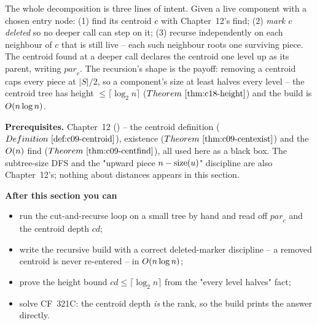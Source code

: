 \begin{topicintro}
The whole decomposition is three lines of intent. Given a live component with a
chosen entry node: (1) find its centroid \(c\) with Chapter~12's find; (2)
\emph{mark \(c\) deleted} so no deeper call can step on it; (3) recurse
independently on each neighbour of \(c\) that is still live -- each such neighbour
roots one surviving piece. The centroid found at a deeper call declares the
centroid one level up as its  parent, writing
\(\mathit{par}_c\). The recursion's shape is the payoff: removing a centroid caps
every piece at \(|S|/2\), so a component's size at least halves every level --
the centroid tree has height \(\le\lceil\log_2 n\rceil\) (\(\thmref{c18-height}\))
and the build is \(O(n\log n)\).

\textbf{Prerequisites.} Chapter~12 () -- the centroid definition
(\(\defref{c09-centroid}\)), existence (\(\thmref{c09-centexist}\)) and the
\(O(n)\) find (\(\thmref{c09-centfind}\)), all used here as a black box. The
subtree-size DFS and the "upward piece \(n-\operatorname{size}(u)\)" discipline are also
Chapter~12's; nothing about distances appears in this section.

\textbf{After this section you can}
\begin{itemize}[nosep]
  \item run the cut-and-recurse loop on a small tree by hand and read off
        \(\mathit{par}_c\) and the centroid depth \(\mathit{cd}\); \hfill{}
  \item write the recursive build with a correct deleted-marker discipline -- a
        removed centroid is never re-entered -- in \(O(n\log n)\); \hfill{}
  \item prove the height bound \(\mathit{cd}\le\lceil\log_2 n\rceil\) from the
        "every level halves" fact; \hfill{}
  \item solve CF~321C: the centroid depth \emph{is} the rank, so the build prints
        the answer directly. \hfill{}
\end{itemize}
\end{topicintro}

